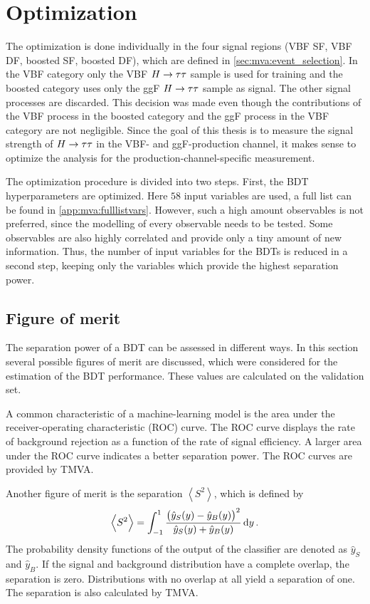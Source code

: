 \section{Optimization}\label{sec:mva:optimization}

The optimization is done individually in the four signal regions (VBF SF, VBF DF, boosted SF, boosted DF), which are defined in \cref{sec:mva:event_selection}.
In the VBF category only the VBF $H \to \tau \tau$ sample is used for training and the boosted category uses only the ggF $H \to \tau \tau$ sample as signal.
The other signal processes are discarded.
This decision was made even though the contributions of the VBF process in the boosted category and
the ggF process in the VBF category are not negligible.
Since the goal of this thesis is to measure the signal strength of $H \to \tau \tau$ in the VBF- and ggF-production channel,
it makes sense to optimize the analysis for the production-channel-specific measurement.

The optimization procedure is divided into two steps.
First, the BDT hyperparameters are optimized. Here $58$ input variables are used, a full list can be found in \cref{app:mva:fulllistvars}.
However, such a high amount observables is not preferred, since the modelling of every observable needs to be tested.
Some observables are also highly correlated and provide only a tiny amount of new information.
Thus, the number of input variables for the BDTs is reduced in a second step, keeping only the variables which provide
the highest separation power.

\subsection{Figure of merit}\label{sub:mva:optimization:fom}

The separation power of a BDT can be assessed in different ways.
In this section several possible figures of merit are discussed,
which were considered for the estimation of the BDT performance.
These values are calculated on the validation set.

A common characteristic of a machine-learning model is the area under the receiver-operating characteristic (ROC) curve.
The ROC curve displays the rate of background rejection as a function of the rate of signal efficiency.
A larger area under the ROC curve indicates a better separation power.
The ROC curves are provided by TMVA\@.

Another figure of merit is the separation $\left<S^2\right>$, which is defined by~\cite{TMVA}
\begin{equation}
    \left<S^2\right> = \int_{-1}^1 \frac{{\left(\hat{y}_S(y) - \hat{y}_B(y)\right)}^2}{\hat{y}_S(y) + \hat{y}_B(y)} \dif y \,.
\end{equation}
The probability density functions of the output of the classifier are denoted as $\hat{y}_S$ and $\hat{y}_B$.
If the signal and background distribution have a complete overlap, the separation is zero.
Distributions with no overlap at all yield a separation of one.
The separation is also calculated by TMVA\@.

